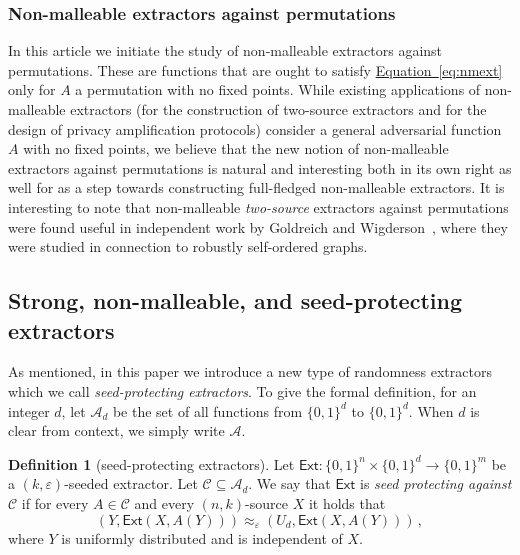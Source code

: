 \documentclass[11pt]{article}
\numberwithin{equation}{section}
\theoremstyle{definition}
\newtheorem{definition}[theorem]{Definition}
\theoremstyle{plain}
\newcommand{\expeqref}[2]{\hyperref[#2]{#1~\eqref{#2}}}
\newcommand{\ccc}{\mathcal{C}}
\newcommand{\ext}{\mathsf{Ext}}
\newcommand{\adv}{A}
\newcommand{\advfam}{\mathcal{A}}
\newcommand{\eps}{\varepsilon}
\begin{document}
%
%
\subsubsection{Non-malleable extractors against permutations}
%
In this %
article  %
we initiate the study of non-malleable extractors against permutations. These are functions that are ought to satisfy \expeqref{Equation}{eq:nmext} only for  $A$ a permutation with no fixed points. While existing applications of non-malleable extractors (for the construction of %
two-source   %
extractors and for the design of privacy amplification protocols) consider a general adversarial function $A$ with no fixed points, we believe that the new notion of non-malleable extractors against permutations is natural and interesting both in its own right as well for as a step towards constructing full-fledged non-malleable extractors.
It is interesting to note that non-malleable \emph{two-source} extractors against permutations were found useful in
%
independent work  %
by Goldreich and Wigderson~\cite{GW21}, where they
were studied in connection to robustly self-ordered graphs.

\subsection{Strong, non-malleable, and seed-protecting extractors}\label{sec:snsp}
As mentioned, in this %
paper  %
we introduce a new type of randomness extractors which we call \emph{seed-protecting extractors}. To give the formal definition, for an integer $d$, let $\advfam_d$ be the set of all functions from $\{0,1\}^d$ to $\{0,1\}^d$. When $d$ is clear from context, we simply write $\advfam$.%

\begin{definition}[seed-protecting extractors]\label{def:sp intro}
	Let $\ext \colon \{0,1\}^n \times \{0,1\}^d \to \{0,1\}^m$ be a $(k,\eps)$-seeded extractor. Let $\ccc \subseteq \advfam_d$. We say that $\ext$ is \emph{seed protecting against $\ccc$} if for every $\adv \in \ccc$ and every $(n,k)$-source $X$ it holds that
	\begin{equation}\label{eq:intro 123}
	\left(Y, \ext(X,\adv(Y))\right) \approx_\eps \left(U_d, \ext(X,\adv(Y))\right)\,,
	\end{equation}
	where $Y$ is uniformly distributed and is independent of $X$.
\end{definition}
\end{document}
